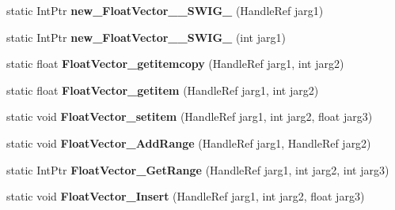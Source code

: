 \begin{DoxyCompactItemize}
\item 
\hypertarget{class_assimp_p_i_n_v_o_k_e_a60afb942de1d1ccf9754ba14ea3a5e15}{static Int\+Ptr {\bfseries new\+\_\+\+Float\+Vector\+\_\+\+\_\+\+S\+W\+I\+G\+\_} (Handle\+Ref jarg1)}\label{class_assimp_p_i_n_v_o_k_e_a60afb942de1d1ccf9754ba14ea3a5e15}

\item 
\hypertarget{class_assimp_p_i_n_v_o_k_e_a89bdae2521af618749598989729dd837}{static Int\+Ptr {\bfseries new\+\_\+\+Float\+Vector\+\_\+\+\_\+\+S\+W\+I\+G\+\_} (int jarg1)}\label{class_assimp_p_i_n_v_o_k_e_a89bdae2521af618749598989729dd837}

\item 
\hypertarget{class_assimp_p_i_n_v_o_k_e_a18606bfb6619dfa0faf55ed75e8e98d7}{static float {\bfseries Float\+Vector\+\_\+getitemcopy} (Handle\+Ref jarg1, int jarg2)}\label{class_assimp_p_i_n_v_o_k_e_a18606bfb6619dfa0faf55ed75e8e98d7}

\item 
\hypertarget{class_assimp_p_i_n_v_o_k_e_ae31fdf781b13416308b2407706799ba2}{static float {\bfseries Float\+Vector\+\_\+getitem} (Handle\+Ref jarg1, int jarg2)}\label{class_assimp_p_i_n_v_o_k_e_ae31fdf781b13416308b2407706799ba2}

\item 
\hypertarget{class_assimp_p_i_n_v_o_k_e_a02e86bd8f24f6039682c3e025c5c2718}{static void {\bfseries Float\+Vector\+\_\+setitem} (Handle\+Ref jarg1, int jarg2, float jarg3)}\label{class_assimp_p_i_n_v_o_k_e_a02e86bd8f24f6039682c3e025c5c2718}

\item 
\hypertarget{class_assimp_p_i_n_v_o_k_e_a71e54aefdec61d5a6230422abf57159e}{static void {\bfseries Float\+Vector\+\_\+\+Add\+Range} (Handle\+Ref jarg1, Handle\+Ref jarg2)}\label{class_assimp_p_i_n_v_o_k_e_a71e54aefdec61d5a6230422abf57159e}

\item 
\hypertarget{class_assimp_p_i_n_v_o_k_e_af348312cefcffb24dfdd371a70b85e1d}{static Int\+Ptr {\bfseries Float\+Vector\+\_\+\+Get\+Range} (Handle\+Ref jarg1, int jarg2, int jarg3)}\label{class_assimp_p_i_n_v_o_k_e_af348312cefcffb24dfdd371a70b85e1d}

\item 
\hypertarget{class_assimp_p_i_n_v_o_k_e_aa024a588e4aea8cf2a9a8ba06e526a4d}{static void {\bfseries Float\+Vector\+\_\+\+Insert} (Handle\+Ref jarg1, int jarg2, float jarg3)}\label{class_assimp_p_i_n_v_o_k_e_aa024a588e4aea8cf2a9a8ba06e526a4d}


\end{DoxyCompactItemize}

